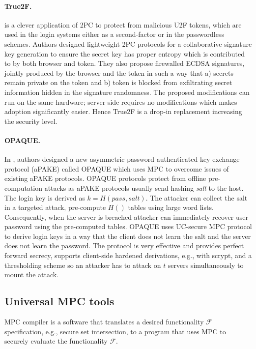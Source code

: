 \documentclass[
  digital, %
  twoside, %
  table,   %
  lof,     %
  lot,     %
]{fithesis3}
\newcounter{ph4_show_guides}
\theoremstyle{definition}
\theoremstyle{remark}
\begin{document}
\paragraph{True2F.} \cite{DCMBR18} is a clever application of 2PC to protect from malicious U2F tokens, which are used in the login systems either as a second-factor or in the passwordless schemes. 
Authors designed lightweight 2PC protocols for a collaborative signature key generation to ensure the secret key has proper entropy which is contributed to by both browser and token. They also propose firewalled ECDSA signatures, jointly produced by the browser and the token in such a way that a) secrets remain private on the token and b) token is blocked from exfiltrating secret information hidden in the signature randomness.
The proposed modifications can run on the same hardware; server-side requires no modifications which makes adoption significantly easier. Hence True2F is a drop-in replacement increasing the security level.
    
\paragraph{OPAQUE.} In \cite{JKX18}, authors designed a new asymmetric password-authenticated key exchange protocol (aPAKE) called OPAQUE which uses MPC to overcome issues of existing aPAKE protocols.
OPAQUE protocols protect from offline pre-computation attacks as aPAKE protocols usually send hashing \emph{salt} to the host. 
The login key is derived as $k=H(pass, salt)$. The attacker can collect the salt in a targeted attack, pre-compute $H()$ tables using large word lists. Consequently, when the server is breached attacker can immediately recover user password using the pre-computed tables. OPAQUE uses UC-secure MPC protocol to derive login keys in a way that the client does not learn the salt and the server does not learn the password. The protocol is very effective and provides perfect forward secrecy, supports client-side hardened derivations, e.g., with scrypt, and a thresholding scheme so an attacker has to attack on $t$ servers simultaneously to mount the attack.

\subsection{Universal MPC tools}
MPC compiler is a software that translates a desired functionality $\mathcal{F}$ specification, e.g., secure set intersection, to a program that uses MPC to securely evaluate the functionality $\mathcal{F}$.
\end{document}

